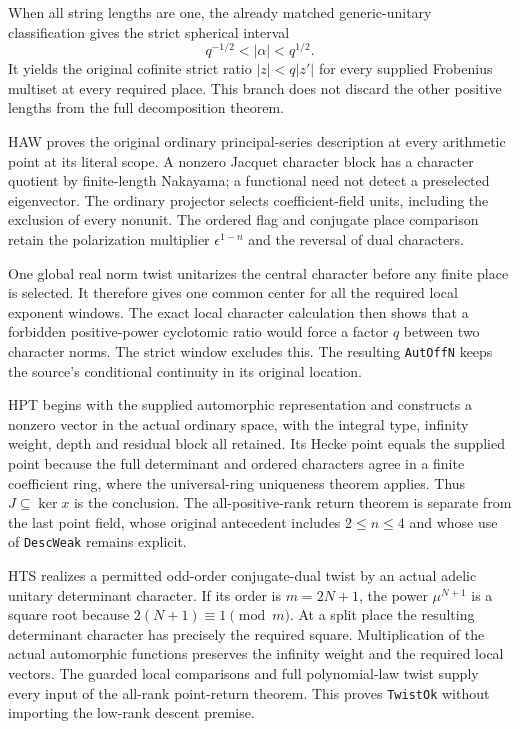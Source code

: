 \documentclass[11pt,a4paper]{article}
\numberwithin{equation}{section}
\theoremstyle{remark}\newtheorem{remark}[theorem]{Remark}
\begin{document}
When all string lengths are one, the already matched
generic-unitary classification gives the strict spherical interval
\[
                   q^{-1/2}<|\alpha|<q^{1/2}.
\]
It yields the original cofinite strict ratio
$|z|<q|z'|$ for every supplied Frobenius multiset at every required
place.  This branch does not discard the other positive lengths
from the full decomposition theorem.

HAW proves the original ordinary principal-series description at
every arithmetic point at its literal scope.  A nonzero Jacquet
character block has a character quotient by finite-length
Nakayama; a functional need not detect a preselected eigenvector.
The ordinary projector selects coefficient-field units, including
the exclusion of every nonunit.  The ordered flag and conjugate
place comparison retain the polarization multiplier
$\epsilon^{1-n}$ and the reversal of dual characters.

One global real norm twist unitarizes the central character before
any finite place is selected.  It therefore gives one common center
for all the required local exponent windows.  The exact local
character calculation then shows that a forbidden positive-power
cyclotomic ratio would force a factor $q$ between two character
norms.  The strict window excludes this.  The resulting
\texttt{Aut\allowbreak Off\allowbreak N} keeps the source's conditional continuity in
its original location.

HPT begins with the supplied automorphic representation and
constructs a nonzero vector in the actual ordinary space, with
the integral type, infinity weight, depth and residual block all
retained.  Its Hecke point equals the supplied point because the
full determinant and ordered characters agree in a finite
coefficient ring, where the universal-ring uniqueness theorem
applies.  Thus $J\subseteq\ker x$ is the conclusion.  The
all-positive-rank return theorem is separate from the last point
field, whose original antecedent includes $2\le n\le4$ and
whose use of \texttt{Desc\allowbreak Weak} remains explicit.

HTS realizes a permitted odd-order conjugate-dual twist by an
actual adelic unitary determinant character.  If its order is
$m=2N+1$, the power $\mu^{N+1}$ is a square root because
$2(N+1)\equiv1\pmod m$.  At a split place the resulting
determinant character has precisely the required square.
Multiplication of the actual automorphic functions preserves the
infinity weight and the required local vectors.  The guarded
local comparisons and full polynomial-law twist supply every
input of the all-rank point-return theorem.  This proves
\texttt{Twist\allowbreak Ok} without importing the low-rank descent premise.
\end{document}
